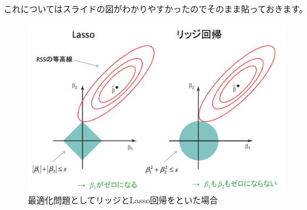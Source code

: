 \documentclass[uplatex]{jsarticle}
\begin{document}
これについてはスライドの図がわかりやすかったのでそのまま貼っておきます。
\begin{figure}
  \begin{center}
  \includegraphics[width=13cm]{img/sikaku.png}
  \caption{最適化問題としてリッジとLasso回帰をといた場合}
\end{center}
\end{figure}
\end{document}
